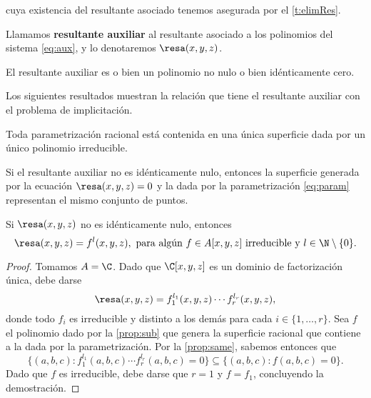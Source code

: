 cuya existencia del resultante asociado tenemos asegurada por el \autoref{t:elimRes}.
\begin{definicion}
    Llamamos \textbf{resultante auxiliar} al resultante asociado a los polinomios del sistema \eqref{eq:aux}, y lo denotaremos $\resa(x,y,z)$.
\end{definicion}
\begin{proposicion}
    El resultante auxiliar es o bien un polinomio no nulo o bien idénticamente cero. 
\end{proposicion}
Los siguientes resultados muestran la relación que tiene el resultante auxiliar con el problema de implicitación.
\begin{proposicion}\label{prop:sub}
    Toda parametrización racional está contenida en una única superficie dada por un único polinomio irreducible.
\end{proposicion}
\begin{proposicion}\label{prop:same}
    Si el resultante auxiliar  no es idénticamente nulo, entonces la superficie generada por la ecuación $\resa(x,y,z)=0$ y la dada por la parametrización \eqref{eq:param} representan el mismo conjunto de puntos.
\end{proposicion}
\begin{teorema}\label{t:potencia}
    Si $\resa(x,y,z)$ no es idénticamente nulo, entonces
    \begin{equation*}
        \resa(x,y,z) = f^l(x,y,z),\text{ para algún } f\in A[x,y,z] \text{ irreducible y } l\in \N\setminus\{0\}.
    \end{equation*}
\end{teorema}
\begin{proof}
    Tomamos $A=\C$. Dado que $\C[x,y,z]$ es un dominio de factorización única, debe darse
    \begin{equation*}
        \resa(x,y,z) = f_1^{l_1}(x,y,z)\cdots f_r^{l_r}(x,y,z),
    \end{equation*}
    donde todo $f_i$ es irreducible y distinto a los demás para cada $i\in \{1,\dots, r\}$. Sea $f$ el polinomio dado por la \autoref{prop:sub} que genera la superficie racional que contiene a la dada por la parametrización. Por la \autoref{prop:same}, sabemos entonces que 
    \begin{equation*}
        \{(a,b,c) :  f_1^{l_1}(a,b,c)\cdots f_r^{l_r}(a,b,c) = 0\} \subseteq \{(a,b,c) : f(a,b,c) = 0\}.
    \end{equation*}
    Dado que $f$ es irreducible, debe darse que $r=1$ y $f=f_1$, concluyendo la demostración.
\end{proof}
